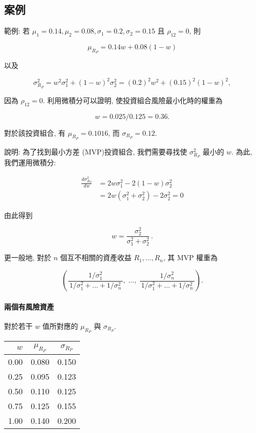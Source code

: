 \documentclass[letterpaper]{article}
\begin{document}
		\subsection{案例}
		範例: 若 $\mu_{1}=0.14, \mu_{2}=0.08, \sigma_{1}=0.2, \sigma_{2}=0.15$ 且 $\rho_{12}=0$, 則  
		
		$$
		\mu_{R_{P}}=0.14w+0.08 (1-w)
		$$
		
		以及  
		
		$$
		\sigma_{R_{P}}^{2}=w^{2}\sigma_{1}^{2}+ (1-w)^{2}\sigma_{2}^{2} 
		= (0.2)^{2}w^{2}+ (0.15)^{2} (1-w)^{2}, 
		$$  
		
		因為 $\rho_{12}=0$. 利用微積分可以證明, 使投資組合風險最小化時的權重為  
		
		$$
		w=0.025/0.125=0.36. 
		$$  
		
		對於該投資組合, 有 $\mu_{R_{P}}=0.1016$, 而 $\sigma_{R_{P}}=0.12$. 
		
		說明: 為了找到最小方差 (MVP)投資組合, 我們需要尋找使 $\sigma_{R_{P}}^{2}$ 最小的 $w$. 為此, 我們運用微積分: 
		
		$$
		\begin{aligned}
			\frac{d \sigma_{R_{P}}^{2}}{d w} & = 2w \sigma_{1}^{2} - 2 (1-w)\sigma_{2}^{2} \\
			& = 2w\left (\sigma_{1}^{2} + \sigma_{2}^{2}\right) - 2\sigma_{2}^{2} = 0
		\end{aligned}
		$$
		
		由此得到
		
		$$
		w = \frac{\sigma_{2}^{2}}{\sigma_{1}^{2} + \sigma_{2}^{2}} \, .
		$$
		
		更一般地, 對於 $n$ 個互不相關的資產收益 $R_{1}, \ldots, R_{n}$, 其 MVP 權重為
		
		$$
		\left (
		\frac{1/\sigma_{1}^{2}}{\, 1/\sigma_{1}^{2} + \ldots + 1/\sigma_{n}^{2}\, }, \;
		\ldots, \;
		\frac{1/\sigma_{n}^{2}}{\, 1/\sigma_{1}^{2} + \ldots + 1/\sigma_{n}^{2}\, }
		\right).
		$$
		
		\paragraph{兩個有風險資產}
		對於若干 $w$ 值所對應的 $\mu_{R_{P}}$ 與 $\sigma_{R_{P}}$. 
		
		\begin{center}
			\begin{tabular}{rcc}
				$w$ & $\mu_{R_{P}}$ & $\sigma_{R_{P}}$ \\
				\hline
				0.00 & 0.080 & 0.150 \\
				0.25 & 0.095 & 0.123 \\
				0.50 & 0.110 & 0.125 \\
				0.75 & 0.125 & 0.155 \\
				1.00 & 0.140 & 0.200 \\
			\end{tabular}
		\end{center}
		
\end{document}
